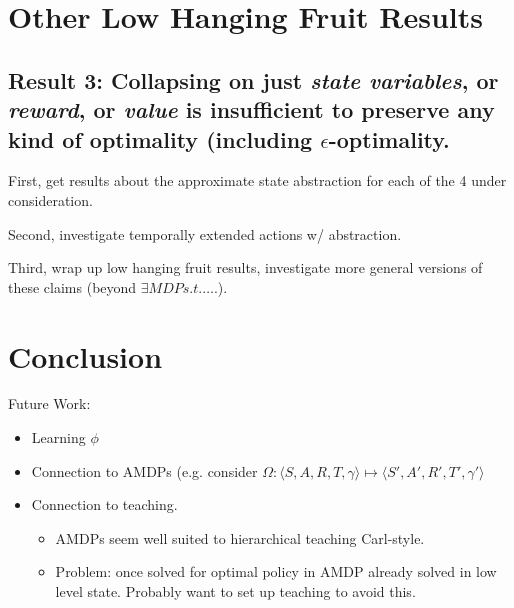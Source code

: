 \documentclass[11pt]{amsart}
\begin{document}
\newpage
\section{Other Low Hanging Fruit Results}


\subsection{Result 3: Collapsing on just {\it state variables}, or {\it reward}, or {\it value} is insufficient to preserve any kind of optimality (including $\epsilon$-optimality.}


First, get results about the approximate state abstraction for each of the 4 under consideration.

Second, investigate temporally extended actions w/ abstraction.

Third, wrap up low hanging fruit results, investigate more general versions of these claims (beyond $\exists MDP s.t. \ldots$.).


\newpage
\section{Conclusion}

Future Work:
\begin{itemize}
\item Learning $\phi$
\item Connection to AMDPs (e.g. consider $\Omega : \langle S, A, R, T, \gamma \rangle \mapsto \langle S', A', R', T', \gamma' \rangle$
\item Connection to teaching.
\begin{itemize}
\item AMDPs seem well suited to hierarchical teaching Carl-style.
\item Problem: once solved for optimal policy in AMDP already solved in low level state. Probably want to set up teaching to avoid this.
\end{itemize}
\end{itemize}



\newpage

\end{document}
